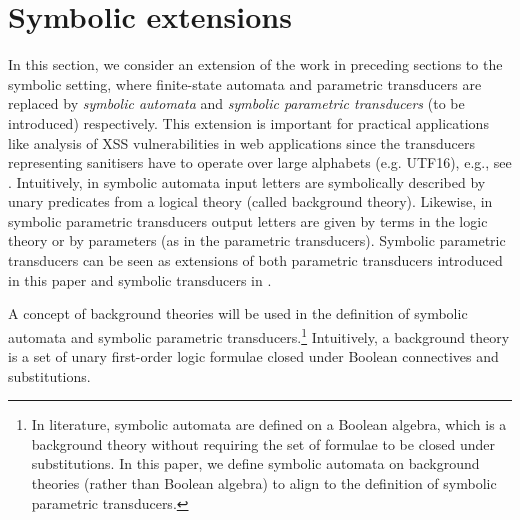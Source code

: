
\vspace{-3mm}

\section{Symbolic extensions}
\label{sec:symbolic}

\vspace{-2mm}

In this section, we consider an extension of the work in preceding sections to the symbolic setting, where finite-state automata and parametric transducers are replaced by \emph{symbolic automata} \cite{NG01,DV14} and \emph{symbolic parametric transducers} (to be introduced) respectively.
This extension is important for
practical applications like analysis of XSS vulnerabilities in web applications
since the transducers representing sanitisers have to operate over
large alphabets (e.g. UTF16), e.g., see \cite{DV13,symbolic-transducer,BEK}.
%
Intuitively, in symbolic automata %
input letters are symbolically described by unary predicates from a logical theory (called background theory). %
%
Likewise, in symbolic parametric transducers %
output letters are given by terms in the logic theory or by parameters (as in the parametric transducers).
Symbolic parametric transducers can be seen as extensions of both parametric
transducers introduced in this paper and symbolic transducers in
\cite{symbolic-transducer}.


A concept of background theories will be used in the definition of symbolic automata and symbolic parametric transducers.\footnote{In literature, symbolic automata are defined on a Boolean algebra, which is a background theory without requiring the set of formulae to be closed under substitutions. In this paper, we define symbolic automata on background theories (rather than Boolean algebra) to align to the definition of symbolic parametric transducers.}
Intuitively, 
a background theory is a set of unary first-order logic formulae closed under Boolean connectives and substitutions. 
 
